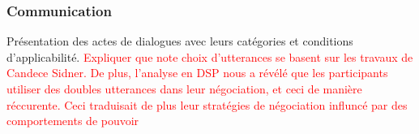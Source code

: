 \subsubsection{Communication}
Présentation des actes de dialogues avec leurs catégories et conditions d'applicabilité. 
\textcolor{red}{Expliquer que note choix d'utterances se basent sur les travaux de Candece Sidner. De plus, l'analyse en DSP nous a révélé que les participants utiliser des doubles utterances dans leur négociation, et ceci de manière réccurente. Ceci traduisait de plus leur stratégies de négociation influncé par des comportements de pouvoir}

